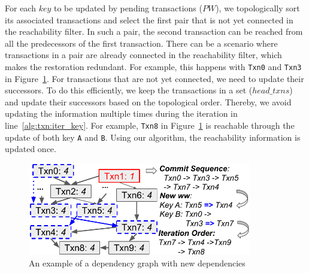 For each $key$ to be updated by pending transactions ($PW$), we topologically
sort its associated transactions and select the first pair that is not yet
connected in the reachability filter.
%
In such a pair, the second transaction can be reached from all the predecessors
of the first transaction.
%
There can be a scenario where transactions in a pair are already connected in
the reachability filter, which makes the restoration redundant.
%
For example, this happens with \texttt{Txn0} and \texttt{Txn3} in
Figure~\ref{diagram:txn:impl:restore}.
%
For transactions that are not yet connected, we need to update their
successors.
%
To do this efficiently, we keep the transactions in a set ($head\_txns$) and
update their successors based on the topological order.
%
Thereby, we avoid updating the information multiple times during the iteration
in line~\ref{alg:txn:iter_key}.
%
For example, \texttt{Txn8} in Figure~\ref{diagram:txn:impl:restore} is reachable through
the update of both key \texttt{A} and \texttt{B}.
%
Using our algorithm, the reachability information is updated once.

\begin{figure}
  \centering
	\includegraphics[width=0.87\textwidth]{diagram/txn/impl_dep_graph.pdf}
  \caption{An example of a dependency graph with new  dependencies}
	\label{diagram:txn:impl:restore}
\end{figure}

